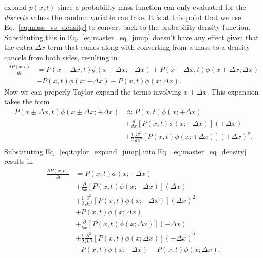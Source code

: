 expand $p(x, t)$ since a probability mass function can only evaluated for the
\textit{discrete} values the random variable can take. It is at this point that
we use Eq.~\ref{eq:mass_vs_density} to convert back to the probability density
function. Substituting this in Eq.~\ref{eq:master_eq_jump} doesn't have any
effect given that the extra $\Delta x$ term that comes along with converting
from a mass to a density cancels from both sides, resulting in
\begin{equation}
\begin{split}
    \frac{d P(x, t)}{dt} &=
    P(x - \Delta x, t) \phi(x - \Delta x; -\Delta x)
    + P(x + \Delta x, t) \phi(x + \Delta x; \Delta x)\\
    &- P(x, t) \phi(x; -\Delta x) 
    - P(x, t) \phi(x; \Delta x).
\end{split}
\label{eq:master_eq_density}
\end{equation}
Now we can properly Taylor expand the terms involving $x \pm \Delta x$. This 
expansion takes the form
\begin{equation}
\begin{split}
    P(x \pm \Delta x, t) \phi(x \pm \Delta x; \mp \Delta x) &\approx
    P(x, t)\phi(x; \mp \Delta x)\\
    &+ \frac{d}{dx}
    \left[ P(x, t) \phi(x; \mp \Delta x)  \right] (\pm \Delta x)\\
    &+ \frac{1}{2} \frac{d^2}{d x^2}
    \left[ P(x, t) \phi(x; \mp \Delta x)  \right] (\pm \Delta x)^2.\\
\end{split}
\label{eq:taylor_expand_jump}
\end{equation}
Substituting Eq.~\ref{eq:taylor_expand_jump} into Eq.~\ref{eq:master_eq_density}
results in
\begin{equation}
\begin{split}
    \frac{\partial P(x, t)}{\partial t} &=
    P(x, t)\phi(x; - \Delta x)\\
    &+ \frac{\partial}{\partial x}
    \left[ P(x, t) \phi(x; - \Delta x)  \right] (\Delta x)\\
    &+ \frac{1}{2} \frac{\partial^2}{\partial x^2}
    \left[ P(x, t) \phi(x; - \Delta x) \right]   (\Delta x)^2\\
    &+ P(x, t) \phi(x; \Delta x)\\
    &+ \frac{\partial}{\partial x}
    \left[ P(x, t) \phi(x; \Delta x)  \right] (- \Delta x)\\
    &+ \frac{1}{2} \frac{\partial ^2}{\partial x^2}
    \left[ P(x, t) \phi(x; \Delta x)  \right] (- \Delta x)^2\\
    &- P(x, t) \phi(x; -\Delta x) 
    - P(x, t) \phi(x; \Delta x).
\end{split}
\end{equation}

